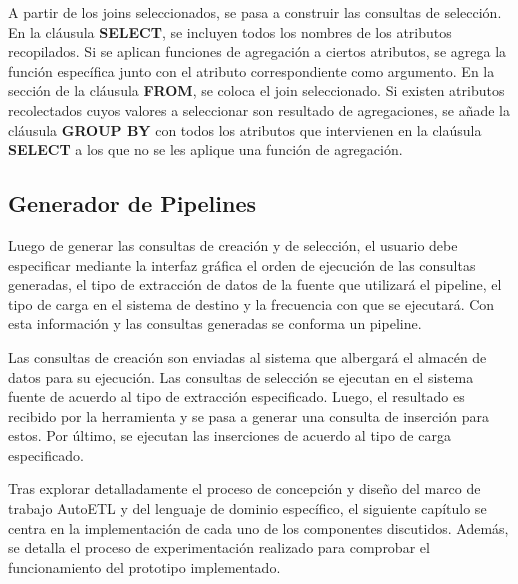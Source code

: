 A partir de los joins seleccionados, se pasa a construir las consultas de selección. En la cláusula \textbf{SELECT}, se 
incluyen todos los nombres de los atributos recopilados. Si se aplican funciones de agregación a ciertos 
atributos, se agrega la función específica junto con el atributo correspondiente como argumento. En la sección 
de la cláusula 
\textbf{FROM}, se coloca el join seleccionado. Si existen atributos recolectados cuyos valores a seleccionar 
son resultado de agregaciones,  se añade 
la cláusula \textbf{GROUP BY} con todos los atributos que intervienen en la cla\'usula \textbf{SELECT} a los que no 
se les aplique una función de agregación.


\subsection{Generador de Pipelines}

Luego de generar las consultas de creación y de selección, el usuario debe especificar 
mediante la interfaz gráfica el orden de ejecución de las consultas generadas, 
el tipo de extracción de datos de la fuente que utilizar\'a el pipeline, el tipo de carga 
en el sistema de destino y la frecuencia con que se ejecutar\'a. Con esta información y las 
consultas generadas se conforma un pipeline. 

Las consultas de creación son enviadas al sistema que albergar\'a el almacén de 
datos para su ejecución. Las consultas de selección se ejecutan en el sistema fuente de acuerdo al tipo 
de extracción especificado. Luego, el resultado es recibido por la herramienta y se pasa a generar una consulta 
de inserción para estos. Por \'ultimo, se ejecutan las inserciones de acuerdo al tipo de carga especificado.


Tras explorar detalladamente el proceso de concepción y diseño del marco de trabajo AutoETL y del 
lenguaje de dominio específico, el siguiente cap\'itulo se centra en la
implementaci\'on de cada uno de los componentes discutidos. Además, se detalla el proceso 
de experimentaci\'on realizado para comprobar el funcionamiento del prototipo implementado.
